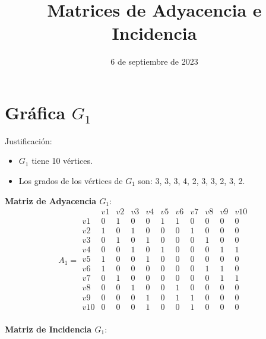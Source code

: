 \documentclass{article}
\begin{document}
\title{Matrices de Adyacencia e Incidencia}
\date{6 de septiembre de 2023}
\maketitle

\section*{Gráfica \( G_1 \)}


Justificación:
\begin{itemize}
	\item \( G_1 \) tiene 10 vértices.
	\item Los grados de los vértices de \( G_1 \) son: 3, 3, 3, 4, 2, 3, 3, 2, 3, 2.
\end{itemize}

\textbf{Matriz de Adyacencia \( G_1 \)}:
\[
A_1 =
\begin{array}{c|cccccccccc}
    & v1 & v2 & v3 & v4 & v5 & v6 & v7 & v8 & v9 & v10 \\
\hline
v1 & 0 & 1 & 0 & 0 & 1 & 1 & 0 & 0 & 0 & 0 \\
v2 & 1 & 0 & 1 & 0 & 0 & 0 & 1 & 0 & 0 & 0 \\
v3 & 0 & 1 & 0 & 1 & 0 & 0 & 0 & 1 & 0 & 0 \\
v4 & 0 & 0 & 1 & 0 & 1 & 0 & 0 & 0 & 1 & 1 \\
v5 & 1 & 0 & 0 & 1 & 0 & 0 & 0 & 0 & 0 & 0 \\
v6 & 1 & 0 & 0 & 0 & 0 & 0 & 0 & 1 & 1 & 0 \\
v7 & 0 & 1 & 0 & 0 & 0 & 0 & 0 & 0 & 1 & 1 \\
v8 & 0 & 0 & 1 & 0 & 0 & 1 & 0 & 0 & 0 & 0 \\
v9 & 0 & 0 & 0 & 1 & 0 & 1 & 1 & 0 & 0 & 0 \\
v10& 0 & 0 & 0 & 1 & 0 & 0 & 1 & 0 & 0 & 0 \\
\end{array}
\]


\textbf{Matriz de Incidencia \( G_1 \)}:
\end{document}

